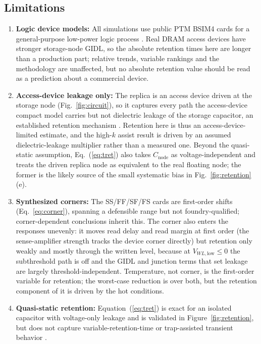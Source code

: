 \documentclass[11pt,a4paper]{article}
\newcommand{\Cnode}{C_{\mathrm{node}}}
\begin{document}
\subsection{Limitations}

\begin{enumerate}
\item \textbf{Logic device models:} All simulations use public PTM BSIM4 cards for
a general-purpose low-power logic process \cite{zhao2006ptm}. Real DRAM access
devices have stronger storage-node GIDL, so the absolute retention times here are
longer than a production part; relative trends, variable rankings and the
methodology are unaffected, but no absolute retention value should be read as a
prediction about a commercial device.
\item \textbf{Access-device leakage only:} The replica is an access device driven
at the storage node (Fig.~\ref{fig:circuit}), so it captures every path the
access-device compact model carries but not dielectric leakage of the storage
capacitor, an established retention mechanism \cite{park2025capleak}. Retention here
is thus an access-device-limited estimate, and the high-$k$ assist result is driven
by an assumed dielectric-leakage multiplier rather than a measured one. Beyond the
quasi-static assumption, Eq.~(\ref{eq:tret}) also takes $\Cnode$ as
voltage-independent and treats the driven replica node as equivalent to the real
floating node; the former is the likely source of the small systematic bias in
Fig.~\ref{fig:retention}(e).
\item \textbf{Synthesized corners:} The SS/FF/SF/FS cards are first-order shifts
(Eq.~\ref{eq:corner}), spanning a defensible range but not foundry-qualified;
corner-dependent conclusions inherit this. The corner also enters the responses
unevenly: it moves read delay and read margin at first order (the sense-amplifier
strength tracks the device corner directly) but retention only weakly and mostly
through the written level, because at $V_{WL,\mathrm{low}}\le0$ the subthreshold
path is off and the GIDL and junction terms that set leakage are largely
threshold-independent. Temperature, not corner, is the first-order variable for
retention; the worst-case reduction is over both, but the retention component of it
is driven by the hot conditions.
\item \textbf{Quasi-static retention:} Equation~(\ref{eq:tret}) is exact for an
isolated capacitor with voltage-only leakage and is validated in
Figure~\ref{fig:retention}, but does not capture variable-retention-time or
trap-assisted transient behavior \cite{kim2021trap,kim2021rdf}.

\end{enumerate}
\end{document}
